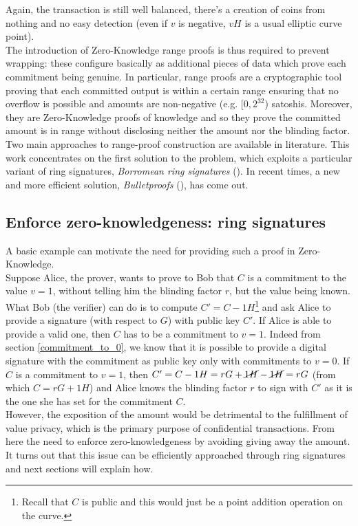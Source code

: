 Again, the transaction is still well balanced, there's a creation of coins from nothing and no easy detection (even if $v$ is negative, $vH$ is a usual elliptic curve point).\\
The introduction of Zero-Knowledge range proofs is thus required to prevent wrapping: these configure basically as additional pieces of data which prove each commitment being genuine. In particular, range proofs are a cryptographic tool proving that each committed output is within a certain range ensuring that no overflow is possible and amounts are non-negative (e.g. [$0,2^{32}$) satoshis. Moreover, they are Zero-Knowledge proofs of knowledge and so they prove the committed amount is in range without disclosing neither the amount nor the blinding factor.\\
Two main approaches to range-proof construction are available in literature. This work concentrates on the first solution to the problem, which exploits a particular variant of ring signatures, \textit{Borromean ring signatures} (\cite{Borromean}). In recent times, a new and more efficient solution, \textit{Bulletproofs} (\cite{Bulletproofs}), has come out.

\subsection{Enforce zero-knowledgeness: ring signatures}
\label{example:ZK}
A basic example can motivate the need for providing such a proof in Zero-Knowledge.\\ 
Suppose Alice, the prover, wants to prove to Bob that $C$ is a commitment to the value $v=1$, without telling him the blinding factor $r$, but the value being known.\\
What Bob (the verifier) can do is to compute $C' = C - 1H$\footnote{Recall that $C$ is public and this would just be a point addition operation on the curve.} and ask Alice to provide a signature (with respect to $G$) with public key $C'$. If Alice is able to provide a valid one, then $C$ has to be a commitment to $v=1$. Indeed from section \ref{commitment_to_0}, we know that it is possible to provide a digital signature with the commitment as public key only with commitments to $v=0$. If $C$ is a commitment to $v=1$, then $C'= C - 1H = rG + \cancel{1H} - \cancel{1H} = rG$ (from which $C = rG + 1H$) and Alice knows the blinding factor $r$ to sign with $C'$ as it is the one she has set for the commitment $C$.\\
However, the exposition of the amount would be detrimental to the fulfillment of value privacy, which is the primary purpose of confidential transactions. From here the need to enforce zero-knowledgeness by avoiding giving away the amount. It turns out that this issue can be efficiently approached through ring signatures and next sections will explain how.

